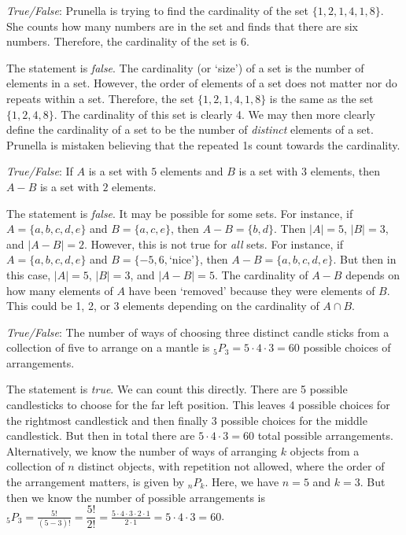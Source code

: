 \documentclass[11pt,letterpaper]{article}
\begin{document}
\thispagestyle{title}

\quizsol \textit{True/False}: Prunella is trying to find the cardinality of the set $\{ 1, 2, 1, 4, 1, 8 \}$. She counts how many numbers are in the set and finds that there are six numbers. Therefore, the cardinality of the set is 6. \pspace

\sol The statement is \textit{false}. The cardinality (or `size') of a set is the number of elements in a set. However, the order of elements of a set does not matter nor do repeats within a set. Therefore, the set $\{ 1, 2, 1, 4, 1, 8 \}$ is the same as the set $\{ 1, 2, 4, 8 \}$. The cardinality of this set is clearly 4. We may then more clearly define the cardinality of a set to be the number of \textit{distinct} elements of a set. Prunella is mistaken believing that the repeated 1s count towards the cardinality. \pvspace{1.3cm}



\quizsol \textit{True/False}: If $A$ is a set with $5$ elements and $B$ is a set with $3$ elements, then $A - B$ is a set with $2$ elements. \pspace

\sol The statement is \textit{false}. It may be possible for some sets. For instance, if $A= \{ a, b, c, d, e \}$ and $B= \{ a, c, e \}$, then $A - B= \{ b, d \}$. Then $|A|= 5$, $|B|= 3$, and $|A - B|= 2$. However, this is not true for \textit{all} sets. For instance, if $A= \{ a, b, c, d, e \}$ and $B= \{ -5, 6, \text{`nice'} \}$, then $A - B= \{ a, b, c, d, e \}$. But then in this case, $|A|= 5$, $|B|= 3$, and $|A - B|= 5$. The cardinality of $A - B$ depends on how many elements of $A$ have been `removed' because they were elements of $B$. This could be 1, 2, or 3 elements depending on the cardinality of $A \cap B$. \pvspace{1.3cm}



\quizsol \textit{True/False}: The number of ways of choosing three distinct candle sticks from a collection of five to arrange on a mantle is $_5P_3= 5 \cdot 4 \cdot 3= 60$ possible choices of arrangements. \pspace

\sol The statement is \textit{true}. We can count this directly. There are 5 possible candlesticks to choose for the far left position. This leaves 4 possible choices for the rightmost candlestick and then finally 3 possible choices for the middle candlestick. But then in total there are $5 \cdot 4 \cdot 3= 60$ total possible arrangements. Alternatively, we know the number of ways of arranging $k$ objects from a collection of $n$ distinct objects, with repetition not allowed, where the order of the arrangement matters, is given by $_n P_k$. Here, we have $n= 5$ and $k= 3$. But then we know the number of possible arrangements is $_5 P_3= \frac{5!}{(5 - 3)!}= \dfrac{5!}{2!}= \frac{5 \cdot 4 \cdot 3 \cdot 2 \cdot 1}{2 \cdot 1}= 5 \cdot 4 \cdot 3= 60$. \pvspace{1.3cm}
\end{document}
